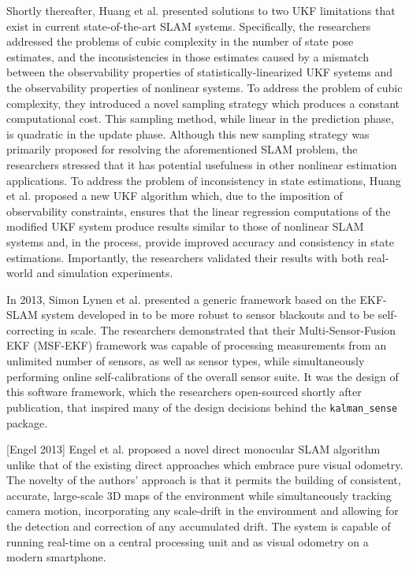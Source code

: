 Shortly thereafter, Huang et al. \cite{Huang2013} presented solutions to two UKF limitations that exist in current state-of-the-art SLAM systems. Specifically, the researchers addressed the problems of cubic complexity in the number of state pose estimates, and the inconsistencies in those estimates caused by a mismatch between the observability properties of statistically-linearized UKF systems and the observability properties of nonlinear systems. To address the problem of cubic complexity, they introduced a novel sampling strategy which produces a constant computational cost. This sampling method, while linear in the prediction phase, is quadratic in the update phase. Although this new sampling strategy was primarily proposed for resolving the aforementioned SLAM problem, the researchers stressed that it has potential usefulness in other nonlinear estimation applications. To address the problem of inconsistency in state estimations, Huang et al. proposed a new UKF algorithm which, due to the imposition of observability constraints, ensures that the linear regression computations of the modified UKF system produce results similar to those of nonlinear SLAM systems and, in the process, provide improved accuracy and consistency in state estimations. Importantly, the researchers validated their results with both real-world and simulation experiments.

In 2013, Simon Lynen et al. \cite{Lynen2013} presented a generic framework based on the EKF-SLAM system developed in \cite{Weiss2012} to be more robust to sensor blackouts and to be self-correcting in scale. The researchers demonstrated that their Multi-Sensor-Fusion EKF (MSF-EKF) framework was capable of processing measurements from an unlimited number of sensors, as well as sensor types, while simultaneously performing online self-calibrations of the overall sensor suite. It was the design of this software framework, which the researchers open-sourced shortly after publication, that inspired many of the design decisions behind the \texttt{kalman\_sense} package.

[Engel 2013] Engel et al. proposed a novel direct monocular SLAM algorithm unlike that of the existing direct approaches which embrace pure visual odometry. The novelty of the authors' approach is that it permits the building of consistent, accurate, large-scale 3D maps of the environment while simultaneously tracking camera motion, incorporating any scale-drift in the environment and allowing for the detection and correction of any accumulated drift. The system is capable of running real-time on a central processing unit and as visual odometry on a modern smartphone.


